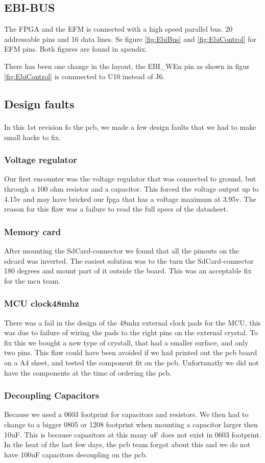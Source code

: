\subsection{EBI-BUS}
The FPGA and the EFM is connected with a high speed parallel bus. 20 addressable pins and 16 data lines.  Se figure \ref{fig:EbiBus} and \ref{fig:EbiControl} for EFM pins. Both figures are found in apendix.


There has been one change in the layout, the EBI\_WEn pin as shown in figur \ref{fig:EbiControl} is connnected to U10 instead of J6.

\subsection{Design faults}
In this 1\textsuperscript{}st revision fo the pcb, we made a few design faults that we had to make small hacks to fix. 
\subsubsection{Voltage regulator}
Our first encounter was the voltage regulator that was connected to ground, but through a 100 ohm resistor and a capacitor. This forced the voltage output up to 4.15v and may have bricked our fpga that has a voltage maximum at 3.95v.
The reason for this flaw was a failure to read the full specs of the datasheet.
\subsubsection{Memory card}
After mounting the SdCard-connector we found that all the pinouts on the sdcard was inverted. The easiest solution was to the turn the SdCard-connector 180 degrees and mount part of it outside the board. This was an acceptable fix for the mcu team. 
\subsubsection{MCU clock48mhz}
There was a fail in the design of the 48mhz external clock pads for the MCU, this was due to failure of wiring the pads to the right pins on the external crystal. To fix this we bought a new type of crystall, that had a smaller surface, and only two pins. This flaw could have been avoided if we had printed out the pcb board on a A4 sheet, and tested the component fit on the pcb. Unfortunatly we did not have the components at the time of ordering the pcb.
\subsubsection{Decoupling Capacitors}
Because we used a 0603 footprint for capacitors and resistors. We then had to change to a bigger 0805 or 1208 footprint when mounting a capacitor larger then 10uF. This is because capasitors at this many uF does not exist in 0603 footprint. In the heat of the last few days, the pcb team forgot about this and we do not have 100uF capacitors decoupling on the pcb.
